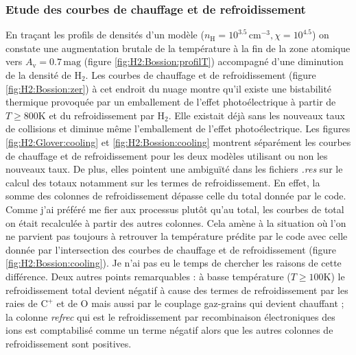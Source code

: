 \subsubsection{Etude des courbes de chauffage et de refroidissement}


En traçant les profils de densités d'un modèle ($n_\mathrm{H} = 10^{3.5}\,\mathrm{cm}^{-3},\chi = 10^{4.5}$) on constate une augmentation brutale de la température à la fin de la zone atomique vers $A_\mathrm{v}=0.7\,\mathrm{mag}$ (figure \ref{fig:H2:Bossion:profilT}) accompagné d'une diminution de la densité de $\mathrm{H}_2$. Les courbes de chauffage et de refroidissement (figure \ref{fig:H2:Bossion:zer}) à cet endroit du nuage montre qu'il existe une bistabilité thermique provoquée par un emballement de l'effet photoélectrique à partir de $T\geq800$K et du refroidissement par $\mathrm{H}_2$. Elle existait déjà sans les nouveaux taux de collisions et diminue même l'emballement de l'effet photoélectrique. Les figures \ref{fig:H2:Glover:cooling} et \ref{fig:H2:Bossion:cooling} montrent séparément les courbes de chauffage et de refroidissement pour les deux modèles utilisant ou non les nouveaux taux. De plus, elles pointent une ambiguïté dans les fichiers \textit{.res} sur le calcul des totaux notamment sur les termes de refroidissement. En effet, la somme des colonnes de refroidissement dépasse celle du total donnée par le code. Comme j'ai préféré me fier aux processus plutôt qu'au total, les courbes de total on était recalculée à partir des autres colonnes. Cela amène à la situation où l'on ne parvient pas toujours à retrouver la température prédite par le code avec celle donnée par l'intersection des courbes de chauffage et de refroidissement (figure \ref{fig:H2:Bossion:cooling}). Je n'ai pas eu le temps de chercher les raisons de cette différence. Deux autres points remarquables : à basse température ($T\geq 100$K) le refroidissement total devient négatif à cause des termes de refroidissement par les raies de $\mathrm{C}^+$ et de $\mathrm{O}$ mais aussi par le couplage gaz-grains qui devient chauffant ; la colonne \textit{refrec} qui est le refroidissement par recombinaison électroniques des ions est comptabilisé comme un terme négatif alors que les autres colonnes de refroidissement sont positives. \newline


